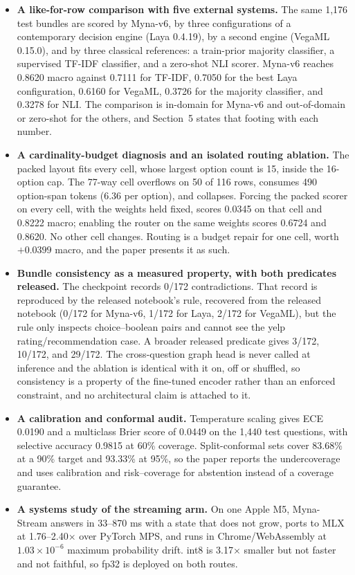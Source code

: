 \documentclass[11pt]{article}
\begin{document}
\begin{itemize}
\item \textbf{A like-for-row comparison with five external systems.} The same 1{,}176 test
bundles are scored by Myna-v6{}, by three configurations of a contemporary decision engine
(Laya 0.4.19), by a second engine (VegaML 0.15.0), and by three classical references: a
train-prior majority classifier, a supervised TF-IDF classifier, and a zero-shot NLI scorer.
Myna-v6{} reaches 0.8620 macro against 0.7111 for TF-IDF, 0.7050 for the best Laya configuration,
0.6160 for VegaML, 0.3726 for the majority classifier, and 0.3278 for NLI. The comparison is
in-domain for Myna-v6{} and out-of-domain or zero-shot for the others, and
Section~5 states that footing with each number.
\item \textbf{A cardinality-budget diagnosis and an isolated routing ablation.} The packed
layout fits every cell, whose largest option count is 15, inside the 16-option cap. The 77-way cell overflows on 50 of 116 rows,
consumes 490 option-span tokens (6.36 per option), and collapses. Forcing the packed scorer on
every cell, with the weights held fixed, scores 0.0345 on that cell and 0.8222 macro; enabling
the router on the same weights scores 0.6724 and 0.8620. No other cell changes. Routing is a
budget repair for one cell, worth $+0.0399$ macro, and the paper presents it as such.
\item \textbf{Bundle consistency as a measured property, with both predicates released.} The
checkpoint records 0/172 contradictions. That record is reproduced by the released notebook's rule,
recovered from the released notebook (0/172 for Myna-v6{}, 1/172 for Laya, 2/172 for VegaML), but
the rule only inspects choice--boolean pairs and cannot see the yelp rating/recommendation case. A
broader released predicate gives 3/172, 10/172, and 29/172. The
cross-question graph head is never called at inference and the ablation is identical with it on,
off or shuffled, so consistency is a property of the fine-tuned encoder rather than an enforced
constraint, and no architectural claim is attached to it.
\item \textbf{A calibration and conformal audit.} Temperature scaling gives ECE 0.0190 and a
multiclass Brier score of 0.0449 on the 1{,}440 test questions, with selective accuracy 0.9815 at
60\% coverage. Split-conformal sets cover 83.68\% at a 90\% target and 93.33\% at 95\%, so the
paper reports the undercoverage and uses calibration and risk--coverage for abstention instead of
a coverage guarantee.
\item \textbf{A systems study of the streaming arm.} On one Apple M5, Myna-Stream{} answers in
33--870 ms with a state that does not grow, ports to MLX at 1.76--2.40$\times$ over PyTorch MPS,
and runs in Chrome/WebAssembly at $1.03\times10^{-6}$ maximum probability drift. int8 is 3.17$\times$
smaller but not faster and not faithful, so fp32 is deployed on both routes.
\end{itemize}
\end{document}
